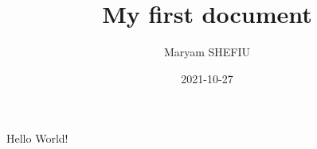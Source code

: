 \documentclass{article}
\title{My first document}
\date{2021-10-27}
\author{Maryam SHEFIU}
\begin{document}
	\maketitle
	\newpage
	Hello World!
\end{document}

